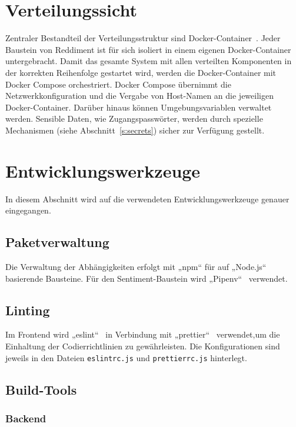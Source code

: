 \documentclass[a4paper, 10pt, conference]{IEEEtran}
\begin{document}
\section{Verteilungssicht} \label{s:verteilungssicht}
Zentraler Bestandteil der Verteilungsstruktur sind Docker-Container~\cite{docker}. Jeder Baustein von Reddiment ist für sich isoliert in einem eigenen Docker-Container untergebracht.
Damit das gesamte System mit allen verteilten Komponenten in der korrekten Reihenfolge gestartet wird, werden die Docker-Container mit Docker Compose orchestriert.
Docker Compose übernimmt die Netzwerkkonfiguration und die Vergabe von Host-Namen an die jeweiligen Docker-Container.
Darüber hinaus können Umgebungsvariablen verwaltet werden. Sensible Daten, wie Zugangspasswörter, werden durch spezielle Mechanismen (siehe Abschnitt~\ref{s:secrets}) sicher zur Verfügung gestellt.

\section{Entwicklungswerkzeuge} \label{s:entwicklungswerkzeuge}

In diesem Abschnitt wird auf die verwendeten Entwicklungswerkzeuge genauer eingegangen.

\subsection{Paketverwaltung}

Die Verwaltung der Abhängigkeiten erfolgt mit „npm“ \cite{npm} für auf „Node.js“ basierende Bausteine. Für den Sentiment-Baustein wird „Pipenv“~\cite{pipenv} verwendet.

\subsection{Linting}

Im Frontend wird „eslint“~\cite{eslint} in Verbindung mit „prettier“~\cite{prettier} verwendet,um die Einhaltung der Codierrichtlinien zu gewährleisten. Die Konfigurationen sind jeweils in den Dateien \texttt{eslintrc.js} und \texttt{prettierrc.js} hinterlegt.

\subsection{Build-Tools}

\subsubsection{Backend}
\end{document}
